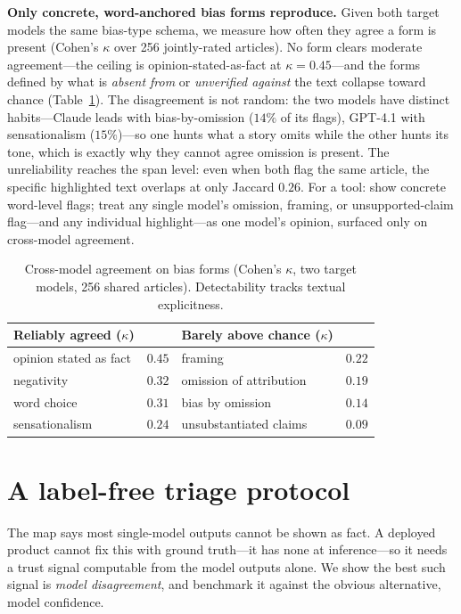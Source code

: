 \documentclass{article}
\newcommand{\kap}{\kappa}
\begin{document}
\textbf{Only concrete, word-anchored bias forms reproduce.} Given both
target models the same bias-type schema, we measure how often they agree
a form is present (Cohen's $\kap$ over 256 jointly-rated articles). No
form clears moderate agreement---the ceiling is opinion-stated-as-fact at
$\kap{=}0.45$---and the forms defined by what is \emph{absent from} or
\emph{unverified against} the text collapse toward chance
(Table~\ref{tab:biastype}). The disagreement is not random: the two
models have distinct habits---Claude leads with bias-by-omission ($14\%$
of its flags), GPT-4.1 with sensationalism ($15\%$)---so one hunts what
a story omits while the other hunts its tone, which is exactly why they
cannot agree omission is present. The unreliability reaches the span
level: even when both flag the same article, the specific highlighted
text overlaps at only Jaccard $0.26$. For a tool: show concrete
word-level flags; treat any single model's omission, framing, or
unsupported-claim flag---and any individual highlight---as one model's
opinion, surfaced only on cross-model agreement.

\begin{table}[h]\centering\small
\begin{tabular}{lc@{\hskip 2em}lc}
\toprule
Reliably agreed ($\kap$) & & Barely above chance ($\kap$) & \\
\midrule
opinion stated as fact & $0.45$ & framing & $0.22$ \\
negativity & $0.32$ & omission of attribution & $0.19$ \\
word choice & $0.31$ & bias by omission & $0.14$ \\
sensationalism & $0.24$ & unsubstantiated claims & $0.09$ \\
\bottomrule
\end{tabular}
\caption{Cross-model agreement on bias forms (Cohen's $\kap$, two target
models, 256 shared articles). Detectability tracks textual
explicitness.}
\label{tab:biastype}
\end{table}

\section{A label-free triage protocol}

The map says most single-model outputs cannot be shown as fact. A
deployed product cannot fix this with ground truth---it has none at
inference---so it needs a trust signal computable from the model outputs
alone. We show the best such signal is \emph{model disagreement}, and
benchmark it against the obvious alternative, model confidence.
\end{document}
